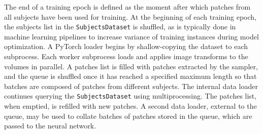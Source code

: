 The end of a training epoch is defined as the moment after which patches from
all subjects have been used for training.
%
At the beginning of each training epoch,
the subjects list in the \texttt{SubjectsDataset} is shuffled,
as is typically done in machine learning pipelines to increase variance
of training instances during model optimization.
%
A PyTorch loader begins by shallow-copying the dataset to each subprocess.
%
Each worker subprocess loads and applies image transforms to the volumes in parallel.
%
A patches list is filled with patches extracted by the sampler,
and the queue is shuffled once it has reached a specified maximum length so that batches are composed of patches from different
subjects.
%
The internal data loader continues querying the \texttt{SubjectsDataset} using multiprocessing.
%
The patches list, when emptied, is refilled with new patches.
%
A second data loader, external to the queue,
may be used to collate batches of patches stored in the queue,
which are passed to the neural network.
